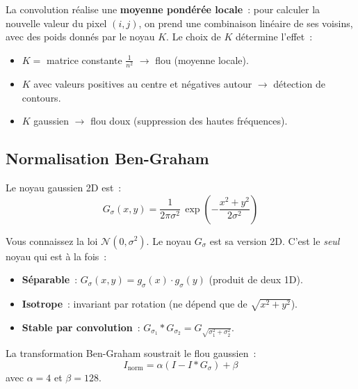\documentclass[11pt,a4paper]{article}
\begin{document}
\begin{intubox}
La convolution r\'ealise une \textbf{moyenne pond\'er\'ee locale}~: pour calculer la nouvelle valeur du pixel $(i,j)$, on prend une combinaison lin\'eaire de ses voisins, avec des poids donn\'es par le noyau $K$. Le choix de $K$ d\'etermine l'effet~:
\begin{itemize}
  \item $K = $ matrice constante $\frac{1}{n^2}$ $\to$ flou (moyenne locale).
  \item $K$ avec valeurs positives au centre et n\'egatives autour $\to$ d\'etection de contours.
  \item $K$ gaussien $\to$ flou doux (suppression des hautes fr\'equences).
\end{itemize}
\end{intubox}

\subsection{Normalisation Ben-Graham}

Le noyau gaussien 2D est~:
\begin{equation}
  G_\sigma(x,y) = \frac{1}{2\pi\sigma^2}\,\exp\!\left(-\frac{x^2+y^2}{2\sigma^2}\right)
\end{equation}

\begin{rappelbox}
Vous connaissez la loi $\mathcal{N}(0,\sigma^2)$. Le noyau $G_\sigma$ est sa version 2D. C'est le \emph{seul} noyau qui est \`a la fois~:
\begin{itemize}
  \item \textbf{S\'eparable}~: $G_\sigma(x,y) = g_\sigma(x) \cdot g_\sigma(y)$ (produit de deux 1D).
  \item \textbf{Isotrope}~: invariant par rotation (ne d\'epend que de $\sqrt{x^2+y^2}$).
  \item \textbf{Stable par convolution}~: $G_{\sigma_1} * G_{\sigma_2} = G_{\sqrt{\sigma_1^2 + \sigma_2^2}}$.
\end{itemize}
\end{rappelbox}

La transformation Ben-Graham soustrait le flou gaussien~:
\begin{equation}
  \boxed{I_{\text{norm}} = \alpha(I - I*G_\sigma) + \beta}
\end{equation}
avec $\alpha = 4$ et $\beta = 128$.
\end{document}
